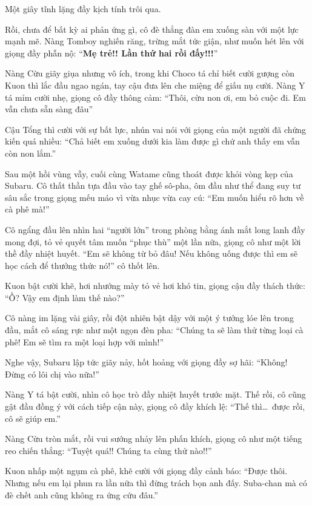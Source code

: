 \documentclass[../main.tex]{subfiles}
\begin{document}
Một giây tĩnh lặng đầy kịch tính trôi qua.

Rồi, chưa để bất kỳ ai phản ứng gì, cô đè thẳng đàn em xuống sàn với một lực mạnh mẽ. Nàng Tomboy nghiến răng, trừng mắt tức giận, như muốn hét lên với giọng đầy phẫn nộ: ``\textbf{Mẹ trẻ!! Lần thứ hai rồi đấy!!!}''


Nàng Cừu giãy giụa nhưng vô ích, trong khi Choco tá chỉ biết cười gượng còn Kuon thì lắc đầu ngao ngán, tay cậu đưa lên che miệng để giấu nụ cười. Nàng Y tá mỉm cười nhẹ, giọng cô đầy thông cảm: ``Thôi, cừu non ơi, em bỏ cuộc đi. Em vẫn chưa sẵn sàng đâu''

Cậu Tổng thì cười với sự bất lực, nhún vai nói với giọng của một người đã chứng kiến quá nhiều: ``Chả biết em xuống dưới kia làm được gì chứ anh thấy em vẫn còn non lắm.''

Sau một hồi vùng vẫy, cuối cùng  Watame cũng thoát được khỏi vòng kẹp của Subaru. Cô thất thần tựa đầu vào tay ghế sô-pha, ôm đầu như thể đang suy tư sâu sắc trong giọng mếu máo vì vừa nhục vừa cay cú: ``Em muốn hiểu rõ hơn về cà phê mà!''

Cô ngẩng đầu lên nhìn hai ``người lớn'' trong phòng bằng ánh mắt long lanh đầy mong đợi, tỏ vẻ quyết tâm muốn ``phục thù'' một lần nữa, giọng cô như một lời thề đầy nhiệt huyết. ``Em sẽ không từ bỏ đâu! Nếu không uống được thì em sẽ học cách để thưởng thức nó!'' cô thốt lên.

Kuon bật cười khẽ, hơi nhướng mày tỏ vẻ hơi khó tin, giọng cậu đầy thách thức: ``Ồ? Vậy em định làm thế nào?''

Cô nàng im lặng vài giây, rồi đột nhiên bật dậy với một ý tưởng lóe lên trong đầu, mắt cô sáng rực như một ngọn đèn pha: ``Chúng ta sẽ làm thử từng loại cà phê! Em sẽ tìm ra một loại hợp với mình!''

Nghe vậy, Subaru lập tức giãy nảy, hốt hoảng với giọng đầy sợ hãi: ``Không! Đừng có lôi chị vào nữa!''

Nàng Y tá bật cười, nhìn cô học trò đầy nhiệt huyết trước mặt. Thế rồi, cô cũng gật đầu đồng ý với cách tiếp cận này, giọng cô đầy khích lệ: ``Thế thì\dots\ được rồi, cô sẽ giúp em.''

Nàng Cừu tròn mắt, rồi vui sướng nhảy lên phấn khích, giọng cô như một tiếng reo chiến thắng: ``Tuyệt quá!! Chúng ta cùng thử nào!!''

Kuon nhấp một ngụm cà phê, khẽ cười với giọng đầy cảnh báo: ``Được thôi. Nhưng nếu em lại phun ra lần nữa thì đừng trách bọn anh đấy. Suba-chan mà có đè chết anh cũng không ra ứng cứu đâu.''
\end{document}
